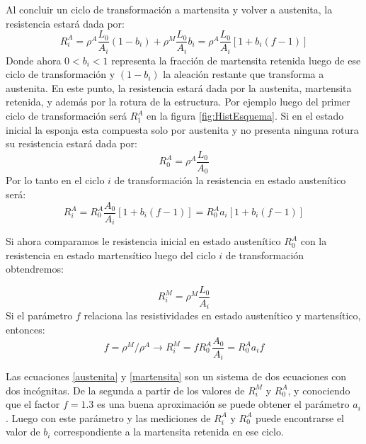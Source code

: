 \documentclass[a4paper,12pt,fleqn,twoside,openany]{book}
\begin{document}
Al concluir un ciclo de transformación a martensita y volver a austenita, la resistencia estará dada por:
\begin{equation}
 R^A _i=\rho^A \frac{L_0}{A_i}(1-b_i) + \rho^M \frac{L_0}{A_i}b_i = \rho^A \frac{L_0}{A_i} [1+ b_i (f-1)]
\end{equation}
Donde ahora $0<b_i <1$ representa la fracción de martensita retenida luego de ese ciclo de transformación y $(1-b_ i)$ la aleación restante que transforma a austenita. En este punto, la resistencia estará dada por la austenita, martensita retenida, y además por la rotura de la estructura. Por ejemplo luego del primer ciclo de transformación será $R^A _{1}$ en la figura \ref{fig:HistEsquema}. 
Si en el estado inicial la esponja esta compuesta solo por austenita y no presenta ninguna rotura su resistencia estará dada por:
\begin{equation}
 R^A _0 = \rho^A \frac{L_0}{A_0}
\end{equation}
Por lo tanto en el ciclo $i$ de transformación la resistencia en estado austenítico será:
\begin{equation}
 R^A _i = R^A _0 \frac{A_0}{A_i} [1+b_i (f-1)]=R^A _0 a_i [1+b_i (f-1)] \label{austenita}
\end{equation}

Si ahora comparamos le resistencia inicial en estado austenítico $R^A _0$ con la resistencia en estado martensítico luego del ciclo $i$ de transformación obtendremos:

\begin{equation}
 R^M _i = \rho ^M \frac{L_0}{A_i}
\end{equation}
Si el parámetro $f$ relaciona las resistividades en estado austenítico y martensítico, entonces:
\begin{equation}
 f=\rho^M / \rho^A \longrightarrow
 R^M _i = f R^A _0 \frac{A_0}{A_i} = R^A _0 a_i f \label{martensita}
\end{equation}

Las ecuaciones \ref{austenita} y \ref{martensita} son un sistema de dos ecuaciones con dos incógnitas. De la segunda a partir de los valores de $R^M _i$ y $R^A _0$, y conociendo que el factor $f = 1.3$ es una buena aproximación se puede obtener el parámetro $a_i$. Luego con este parámetro y las mediciones de $R^A _i$ y $R^A _0$ puede encontrarse el valor de $b_i$ correspondiente a la martensita retenida en ese ciclo.  
\end{document}
